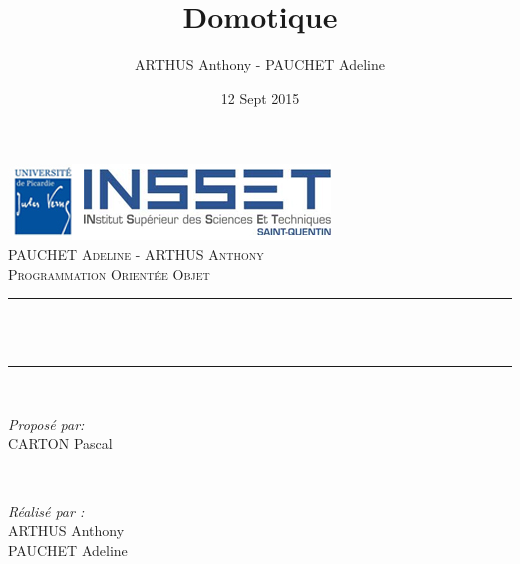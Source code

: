 \documentclass[12pt]{article}
\title{Domotique}								%
\author{ARTHUS Anthony - PAUCHET Adeline}								%
\date{12 Sept 2015}											%
\makeatletter
\let\thetitle\@title
\makeatother
\begin{document}

\begin{titlepage}
	\centering
    \vspace*{0.5 cm}
    \includegraphics[scale = 0.75]{insset.jpg}\\[1.0 cm]	%
    \textsc{\LARGE PAUCHET Adeline - ARTHUS Anthony}\\[2.0 cm]	%
	\textsc{\Large Programmation Orientée Objet}\\[0.5 cm]				%
	\rule{\linewidth}{0.2 mm} \\[0.4 cm]
	{ \huge \bfseries \thetitle}\\
	\rule{\linewidth}{0.2 mm} \\[1.5 cm]
	
	\begin{minipage}{0.4\textwidth}
		\begin{flushleft} \large
			\emph{Proposé par:}\\
			CARTON Pascal\\
			\end{flushleft}
			\end{minipage}~
			\begin{minipage}{0.4\textwidth}
            
			\begin{flushright} \large
			\emph{Réalisé par :} \\
			ARTHUS Anthony\\
            PAUCHET Adeline\\
		\end{flushright}
        
	\end{minipage}\\[2 cm]
	
	
    
    
    
    
	
\end{titlepage}


\tableofcontents
\pagebreak
\end{document}
